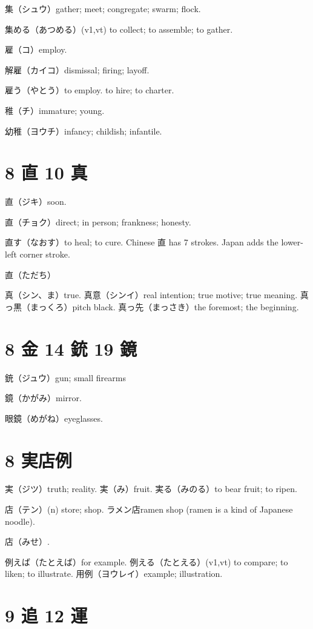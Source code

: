 集（シュウ）gather; meet; congregate; swarm; flock.

集める（あつめる）(v1,vt) to collect; to assemble; to gather.

雇（コ）employ.

解雇（カイコ）dismissal; firing; layoff.

雇う（やとう）to employ. to hire; to charter.

稚（チ）immature; young.

幼稚（ヨウチ）infancy; childish; infantile.

\section{8 直 10 真}

直（ジキ）soon.

直（チョク）direct; in person; frankness; honesty.

直す（なおす）to heal; to cure.
Chinese 直 has 7 strokes.
Japan adds the lower-left corner stroke.

直（ただち）

真（シン、ま）true.
真意（シンイ）real intention; true motive; true meaning.
真っ黒（まっくろ）pitch black.
真っ先（まっさき）the foremost; the beginning.

\section{8 金 14 銃 19 鏡}

銃（ジュウ）gun; small firearms

鏡（かがみ）mirror.

眼鏡（めがね）eyeglasses.

\section{8 実店例}

実（ジツ）truth; reality.
実（み）fruit.
実る（みのる）to bear fruit; to ripen.

店（テン）(n) store; shop.
ラメン店ramen shop (ramen is a kind of Japanese noodle).

店（みせ）.

例えば（たとえば）for example.
例える（たとえる）(v1,vt)
to compare; to liken; to illustrate.
用例（ヨウレイ）example; illustration.

\section{9 追 12 運}

